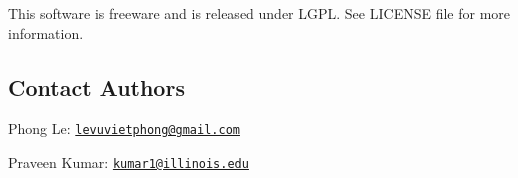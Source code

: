 This software is freeware and is released under L\+G\+PL. See L\+I\+C\+E\+N\+SE file for more information.

\subsection*{Contact Authors}


\begin{DoxyItemize}
\item Phong Le\+: \href{mailto:levuvietphong@gmail.com}{\tt levuvietphong@gmail.\+com}
\item Praveen Kumar\+: \href{mailto:kumar1@illinois.edu}{\tt kumar1@illinois.\+edu} 
\end{DoxyItemize}